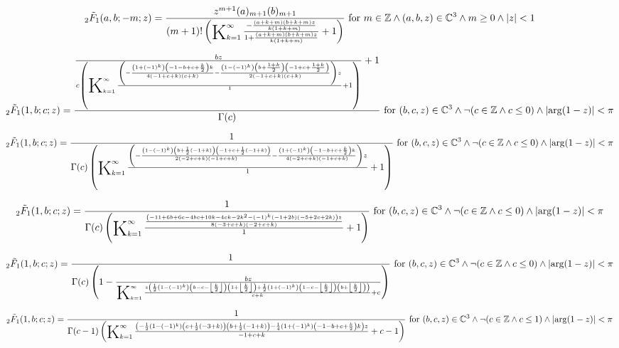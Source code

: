 \documentclass{article}
\newcommand{\bigK}{\mathop{\raisebox{-5pt}{\huge K}}}
\begin{document}
\[\, _2\tilde{F}_1(a,b;-m;z)=\frac{z^{m+1} (a)_{m+1} (b)_{m+1}}{(m+1)! \left(\bigK_{k=1}^{\infty}\frac{-\frac{(a+k+m) (b+k+m) z}{k (1+k+m)}}{1+\frac{(a+k+m) (b+k+m) z}{k (1+k+m)}}+1\right)}\text{ for }m\in \mathbb{Z}\land (a,b,z)\in \mathbb{C}^3\land m\geq 0\land \left| z\right| <1\] 

\[\, _2\tilde{F}_1(1,b;c;z)=\frac{\frac{b z}{c \left(\bigK_{k=1}^{\infty}\frac{\left(-\frac{\left(1+(-1)^k\right) \left(-1-b+c+\frac{k}{2}\right) k}{4 (-1+c+k) (c+k)}-\frac{\left(1-(-1)^k\right) \left(b+\frac{1+k}{2}\right) \left(-1+c+\frac{1+k}{2}\right)}{2 (-1+c+k) (c+k)}\right) z}{1}+1\right)}+1}{\Gamma (c)}\text{ for }(b,c,z)\in \mathbb{C}^3\land \neg (c\in \mathbb{Z}\land c\leq 0)\land \left| \arg (1-z)\right| <\pi\] 

\[\, _2\tilde{F}_1(1,b;c;z)=\frac{1}{\Gamma (c) \left(\bigK_{k=1}^{\infty}\frac{\left(-\frac{\left(1-(-1)^k\right) \left(b+\frac{1}{2} (-1+k)\right) \left(-1+c+\frac{1}{2} (-1+k)\right)}{2 (-2+c+k) (-1+c+k)}-\frac{\left(1+(-1)^k\right) \left(-1-b+c+\frac{k}{2}\right) k}{4 (-2+c+k) (-1+c+k)}\right) z}{1}+1\right)}\text{ for }(b,c,z)\in \mathbb{C}^3\land \neg (c\in \mathbb{Z}\land c\leq 0)\land \left| \arg (1-z)\right| <\pi\] 

\[\, _2\tilde{F}_1(1,b;c;z)=\frac{1}{\Gamma (c) \left(\bigK_{k=1}^{\infty}\frac{\frac{\left(-11+6 b+6 c-4 b c+10 k-4 c k-2 k^2-(-1)^k (-1+2 b) (-5+2 c+2 k)\right) z}{8 (-3+c+k) (-2+c+k)}}{1}+1\right)}\text{ for }(b,c,z)\in \mathbb{C}^3\land \neg (c\in \mathbb{Z}\land c\leq 0)\land \left| \arg (1-z)\right| <\pi\] 

\[\, _2\tilde{F}_1(1,b;c;z)=\frac{1}{\Gamma (c) \left(1-\frac{b z}{\bigK_{k=1}^{\infty}\frac{z \left(\frac{1}{2} \left(1-(-1)^k\right) \left(b-c-\left\lfloor \frac{k}{2}\right\rfloor \right) \left(1+\left\lfloor \frac{k}{2}\right\rfloor \right)+\frac{1}{2} \left(1+(-1)^k\right) \left(1-c-\left\lfloor \frac{k}{2}\right\rfloor \right) \left(b+\left\lfloor \frac{k}{2}\right\rfloor \right)\right)}{c+k}+c}\right)}\text{ for }(b,c,z)\in \mathbb{C}^3\land \neg (c\in \mathbb{Z}\land c\leq 0)\land \left| \arg (1-z)\right| <\pi\] 

\[\, _2\tilde{F}_1(1,b;c;z)=\frac{1}{\Gamma (c-1) \left(\bigK_{k=1}^{\infty}\frac{\left(-\frac{1}{2} \left(1-(-1)^k\right) \left(c+\frac{1}{2} (-3+k)\right) \left(b+\frac{1}{2} (-1+k)\right)-\frac{1}{4} \left(1+(-1)^k\right) \left(-1-b+c+\frac{k}{2}\right) k\right) z}{-1+c+k}+c-1\right)}\text{ for }(b,c,z)\in \mathbb{C}^3\land \neg (c\in \mathbb{Z}\land c\leq 1)\land \left| \arg (1-z)\right| <\pi\] 
\end{document}
